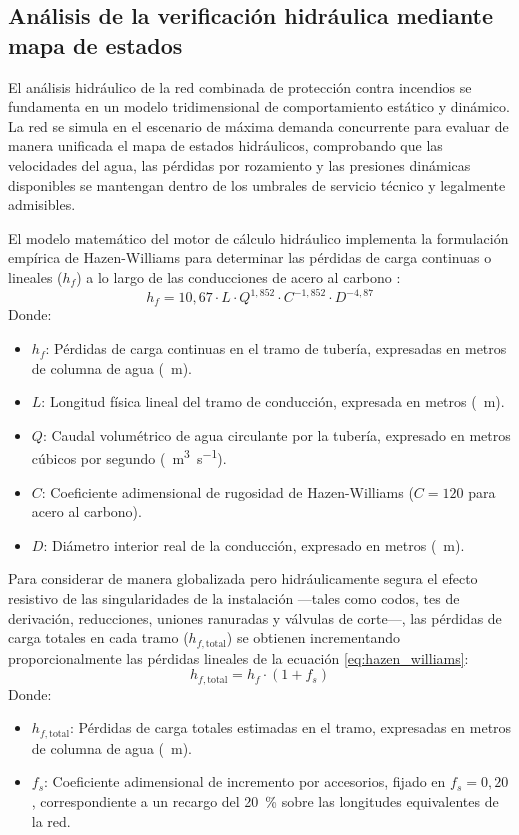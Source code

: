 \documentclass[12pt,a4paper]{article}
\begin{document}
\subsection{Análisis de la verificación hidráulica mediante mapa de estados}

El análisis hidráulico de la red combinada de protección contra incendios se fundamenta en un modelo tridimensional de comportamiento estático y dinámico. La red se simula en el escenario de máxima demanda concurrente para evaluar de manera unificada el mapa de estados hidráulicos, comprobando que las velocidades del agua, las pérdidas por rozamiento y las presiones dinámicas disponibles se mantengan dentro de los umbrales de servicio técnico y legalmente admisibles. 

El modelo matemático del motor de cálculo hidráulico implementa la formulación empírica de Hazen-Williams para determinar las pérdidas de carga continuas o lineales ($h_f$) a lo largo de las conducciones de acero al carbono \parencite{UNE_EN_12845}:
\begin{equation}
h_f = 10,67 \cdot L \cdot Q^{1,852} \cdot C^{-1,852} \cdot D^{-4,87}
\label{eq:hazen_williams}
\end{equation}
Donde:
\begin{itemize}
	\item $h_f$: Pérdidas de carga continuas en el tramo de tubería, expresadas en metros de columna de agua (\SI{}{\meter}).
	\item $L$: Longitud física lineal del tramo de conducción, expresada en metros (\SI{}{\meter}).
	\item $Q$: Caudal volumétrico de agua circulante por la tubería, expresado en metros cúbicos por segundo (\SI{}{\meter\cubed\per\second}).
	\item $C$: Coeficiente adimensional de rugosidad de Hazen-Williams ($C = 120$ para acero al carbono).
	\item $D$: Diámetro interior real de la conducción, expresado en metros (\SI{}{\meter}).
\end{itemize}

Para considerar de manera globalizada pero hidráulicamente segura el efecto resistivo de las singularidades de la instalación ---tales como codos, tes de derivación, reducciones, uniones ranuradas y válvulas de corte---, las pérdidas de carga totales en cada tramo ($h_{f, \text{total}}$) se obtienen incrementando proporcionalmente las pérdidas lineales de la ecuación \ref{eq:hazen_williams}:
\begin{equation}
h_{f, \text{total}} = h_f \cdot (1 + f_s)
\label{eq:perdidas_totales}
\end{equation}
Donde:
\begin{itemize}
	\item $h_{f, \text{total}}$: Pérdidas de carga totales estimadas en el tramo, expresadas en metros de columna de agua (\SI{}{\meter}).
	\item $f_s$: Coeficiente adimensional de incremento por accesorios, fijado en $f_s = 0,20$, correspondiente a un recargo del \SI{20}{\percent} sobre las longitudes equivalentes de la red.
\end{itemize}
\end{document}

